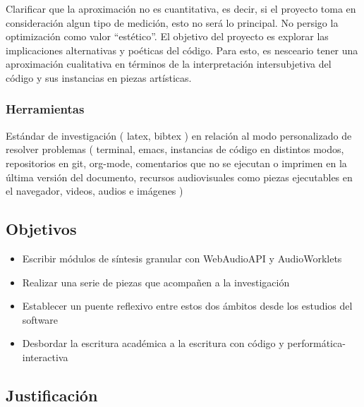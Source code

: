 \documentclass[12pt,a4paper, openright,
headinclude,footinclude,BCOR5mm,
numbers=noenddot,cleardoublepage=empty,
tablecaptionabove]{article}
\begin{document}
Clarificar que la aproximación no es cuantitativa, es decir, si el proyecto toma en consideración algun tipo de medición, esto no será lo principal. No persigo la optimización como valor ``estético''. El objetivo del proyecto es explorar las implicaciones alternativas y poéticas del código. Para esto, es nesceario tener una aproximación cualitativa en términos de la interpretación intersubjetiva del código y sus instancias en piezas artísticas. 



\subsubsection{Herramientas}

Estándar de investigación ( latex, bibtex ) en relación al modo personalizado de resolver problemas ( terminal, emacs, instancias de código en distintos modos, repositorios en git, org-mode, comentarios que no se ejecutan o imprimen en la última versión del documento, recursos audiovisuales como piezas ejecutables en el navegador, videos, audios e imágenes )


\subsection{Objetivos}

\begin{itemize}
\item Escribir módulos de síntesis granular con WebAudioAPI y AudioWorklets
\item Realizar una serie de piezas que acompañen a la investigación
\item Establecer un puente reflexivo entre estos dos ámbitos desde los estudios del software
\item Desbordar la escritura académica a la escritura con código y performática-interactiva
\end{itemize}

\subsection{Justificación}
\end{document}
